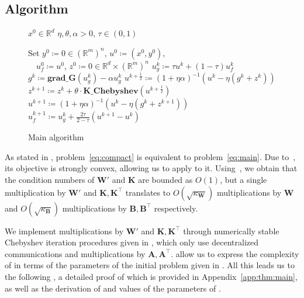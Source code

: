 \documentclass{article}
\newcommand{\R}{\mathbb{R}}
\newcommand{\sX}{\R^d}
\newcommand{\sY}{\R^m}
\newcommand{\mA}{\mathbf{A}}
\newcommand{\mB}{\mathbf{B}}
\newcommand{\mK}{\mathbf{K}}
\newcommand{\mW}{\mathbf{W}}
\newcommand{\pW}{\mathbf{W'}}
\newcommand{\eqdef}{\coloneqq}
\newcommand{\Kcheb}{\mathrm{\mathbf{K\_Chebyshev}}}
\newcommand{\gradG}{\mathrm{\mathbf{grad\_G}}}
\begin{document}
\subsection{Algorithm}\label{subsec:algorithm}
\begin{figure}
\begin{minipage}{7.8cm}
  \vspace{-0.87cm}
  \begin{algorithm}[H]
      \caption{Main algorithm}
  	\label{alg:main}
  	\begin{algorithmic}[1]
      $x^0 \in \sX$
  		$\eta,\theta,\alpha>0$, $\tau \in (0,1)$
  
  		\State Set $y^0 \eqdef 0 \in (\sY)^n$, $u^0 \eqdef (x^0, y^0)$,
      \\  \quad \ \ $u_f^0 \eqdef u^0$, $z^0 \eqdef 0 \in \sX \times (\sY)^n$
  		\State $u_g^k \eqdef \tau u^k +  (1-\tau)u_f^k$
      \State $g^k \eqdef \gradG(u_g^k) - \alpha u_g^k$
  		\State $u^{k+\frac{1}{2}} \eqdef (1+\eta\alpha)^{-1}(u^k - \eta (g^k + z^k))$
      \State $z^{k+1} \eqdef z^k  + \theta \cdot \Kcheb(u^{k+\frac12})$
  		\State $u^{k+1} \eqdef (1+\eta\alpha)^{-1}(u^k - \eta (g^k + z^{k+1}))$
  		\State $u_f^{k+1} \eqdef u_g^k + \tfrac{2\tau}{2-\tau}(u^{k+1} - u^k)$
  		\EndFor
  	\end{algorithmic}
  \end{algorithm}
\end{minipage}
\end{figure}
As stated in , problem~\eqref{eq:compact} is equivalent to problem~\eqref{eq:main}.
Due to~, its objective is strongly convex, allowing us to apply  to it.
Using~, we obtain that the condition numbers of $\pW$ and $\mK$ are bounded as $O(1)$,
but a single multiplication by $\pW$ and $\mK, \mK^\top$ translates to $O(\sqrt{\kappa_\mW})$ multiplications by $\mW$ and $O(\sqrt{\kappa_\mB})$ multiplications by $\mB, \mB^\top$ respectively.

We implement multiplications by $\pW$ and $\mK, \mK^\top$ through numerically stable Chebyshev iteration procedures given in , which only use decentralized communications and multiplications by $\mA, \mA^\top$. 
 allow us to express the complexity of  in terms of the parameters of the initial problem given in .
All this leads us to the following , a detailed proof of which is provided in Appendix~\ref{app:thm:main}, as well as the derivation of  and values of the parameters of .
\end{document}
